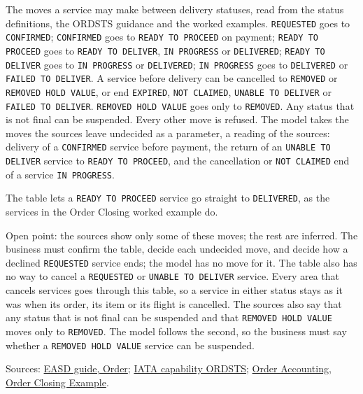 \begin{definition}
  \label{def:delivery-moves}
  The moves a service may make between delivery statuses, read from the
  status definitions, the ORDSTS guidance and the worked examples.
  \texttt{REQUESTED} goes to \texttt{CONFIRMED}; \texttt{CONFIRMED} goes to
  \texttt{READY TO PROCEED} on payment; \texttt{READY TO PROCEED} goes to
  \texttt{READY TO DELIVER}, \texttt{IN PROGRESS} or \texttt{DELIVERED};
  \texttt{READY TO DELIVER} goes to \texttt{IN PROGRESS} or
  \texttt{DELIVERED}; \texttt{IN PROGRESS} goes to \texttt{DELIVERED} or
  \texttt{FAILED TO DELIVER}.  A service before delivery can be cancelled to
  \texttt{REMOVED} or \texttt{REMOVED HOLD VALUE}, or end \texttt{EXPIRED},
  \texttt{NOT CLAIMED}, \texttt{UNABLE TO DELIVER} or
  \texttt{FAILED TO DELIVER}.  \texttt{REMOVED HOLD VALUE} goes only to
  \texttt{REMOVED}.  Any status that is not final can be suspended.  Every
  other move is refused.  The model takes the moves the sources leave
  undecided as a parameter, a reading of the sources: delivery of a
  \texttt{CONFIRMED} service before payment, the return of an
  \texttt{UNABLE TO DELIVER} service to \texttt{READY TO PROCEED}, and the
  cancellation or \texttt{NOT CLAIMED} end of a service
  \texttt{IN PROGRESS}.

  The table lets a \texttt{READY TO PROCEED} service go straight to
  \texttt{DELIVERED}, as the services in the Order Closing worked example do.

  Open point: the sources show only some of these moves; the rest are
  inferred.  The business must confirm the table, decide each undecided
  move, and decide how a declined \texttt{REQUESTED} service ends; the model
  has no move for it.  The table also has no way to cancel a
  \texttt{REQUESTED} or \texttt{UNABLE TO DELIVER} service.  Every area
  that cancels services goes through this table, so a service in either
  status stays as it was when its order, its item or its flight is
  cancelled.  The sources also say that any status that is not
  final can be suspended and that \texttt{REMOVED HOLD VALUE} moves only to
  \texttt{REMOVED}.  The model follows the second, so the business must say
  whether a \texttt{REMOVED HOLD VALUE} service can be suspended.

  Sources: \href{https://standards.atlassian.net/wiki/spaces/EASD/pages/574849062/Order}{EASD guide, Order};
  \href{https://retailing.iata.org/armi/docs/ORDSTS/}{IATA capability ORDSTS};
  \href{https://standards.atlassian.net/wiki/spaces/OA/pages/2531491864}{Order Accounting, Order Closing Example}.
\end{definition}

